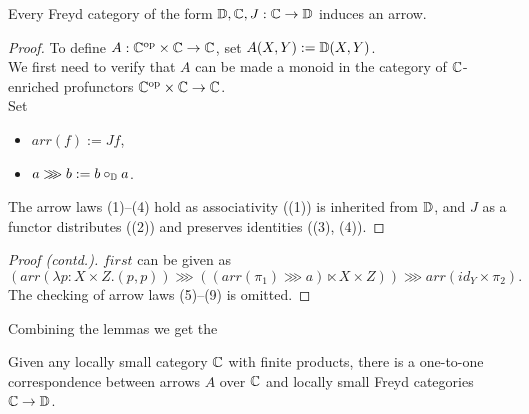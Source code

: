 \begin{frame}
\begin{lemma}
    Every Freyd category of the form $\mathbb{D}, \mathbb{C}, J: \mathbb{C} \to \mathbb{D}$ induces
    an arrow.
\end{lemma}
\end{frame}

\begin{frame}
\begin{proof}
\renewcommand{\qedsymbol}{}
    To define $A: {\mathbb{C}}^{\text{op}} \times \mathbb{C} \to \mathbb{C}$, set $A(X, Y) :=
    \mathbb{D}(X,Y)$. \\
    \vspace{1em}
    We first need to verify that $A$ can be made a monoid in the category
    of $\mathbb{C}$-enriched profunctors ${\mathbb{C}}^{\text{op}} \times \mathbb{C} \to \mathbb{C}$.\\
    \vspace{1em}
    Set
    \begin{itemize}
        \item $arr(f) := Jf$,
        \item $a \ggg b := b \circ_{\mathbb{D}} a$.
    \end{itemize}
    The arrow laws (1)--(4) hold as associativity ((1)) is inherited from
    $\mathbb{D}$, and $J$ as a functor distributes ((2)) and preserves identities ((3),
    (4)).
\end{proof}
\end{frame}

\begin{frame}
\begin{proof}[Proof (contd.)]
$first$ can be given as
    \[
        (arr(\lambda p : X \times Z. (p, p))
          \ggg ((arr(\pi_1) \ggg a) \ltimes X \times Z))
          \ggg arr(id_Y \times \pi_2).
    \]
The checking of arrow laws (5)--(9) is omitted.
\end{proof}
\end{frame}

\begin{frame}
Combining the lemmas we get the
\begin{theorem}
    Given any locally small category $\mathbb{C}$ with finite products, there is a
    one-to-one correspondence between arrows $A$ over $\mathbb{C}$ and locally small
    Freyd categories $\mathbb{C} \to \mathbb{D}$.
\end{theorem}
\end{frame}

